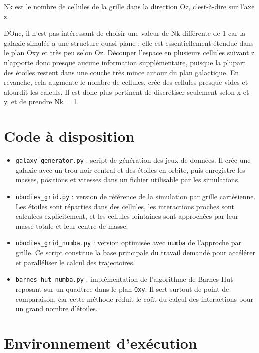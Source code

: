 \documentclass[11pt,a4paper]{article}
\begin{document}
Nk est le nombre de cellules de la grille 
dans la direction Oz, c'est-à-dire sur l'axe z.

 DOnc, il n'est pas intéressant de choisir une valeur de Nk 
 différente de 1 car la galaxie simulée a une 
 structure quasi plane : elle est essentiellement 
 étendue dans le plan Oxy et très peu selon Oz. 
 Découper l'espace en plusieurs cellules suivant 
 z n'apporte donc presque aucune information 
 supplémentaire, puisque la plupart des étoiles restent 
 dans une couche très mince autour du plan galactique. 
 En revanche, cela augmente le nombre de cellules, 
 crée des cellules presque vides et alourdit les calculs. 
 Il est donc plus pertinent de discrétiser seulement selon 
 x et y, et de prendre Nk = 1.

\section{Code à disposition}

\begin{itemize}
    \item \texttt{galaxy\_generator.py} : script de génération des jeux de données. Il crée une galaxie avec un trou noir central et des étoiles en orbite, puis enregistre les masses, positions et vitesses dans un fichier utilisable par les simulations.
    \item \texttt{nbodies\_grid.py} : version de référence de la simulation par grille cartésienne. Les étoiles sont réparties dans des cellules, les interactions proches sont calculées explicitement, et les cellules lointaines sont approchées par leur masse totale et leur centre de masse.
    \item \texttt{nbodies\_grid\_numba.py} : version optimisée avec \texttt{numba} de l'approche par grille. Ce script constitue la base principale du travail demandé pour accélérer et paralléliser le calcul des trajectoires.
    \item \texttt{barnes\_hut\_numba.py} : implémentation de l'algorithme de Barnes-Hut reposant sur un quadtree dans le plan \texttt{Oxy}. Il sert surtout de point de comparaison, car cette méthode réduit le coût du calcul des interactions pour un grand nombre d'étoiles.
\end{itemize}

\section{Environnement d'exécution}
\end{document}
